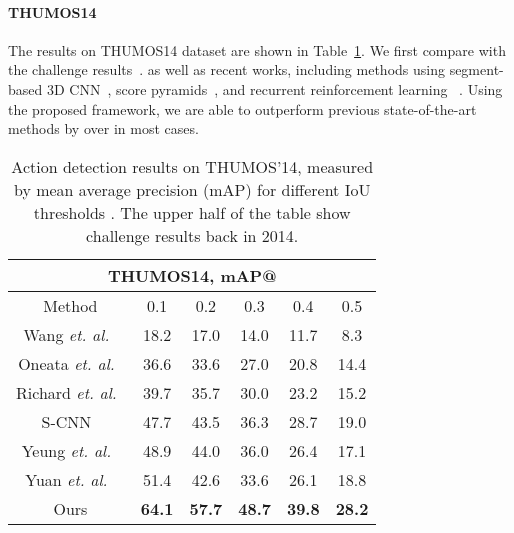 \documentclass[10pt,twocolumn,letterpaper]{article}
\begin{document}
\vspace{-10pt}
\paragraph{THUMOS14}
The results on THUMOS14 dataset are shown in Table~\ref{table: thumos14}.
We first compare with the challenge results~\cite{wang2014action,oneata2014lear,Richard2016Language}. 
as well as recent works, including methods using segment-based 3D CNN~\cite{Shou2016SCNN}, 
score pyramids~\cite{Yuan2016ScorePyramids}, and recurrent reinforcement learning ~\cite{Yeung2016FrameGlimpse}.
Using the proposed framework, we are able to outperform previous state-of-the-art methods by over  in most cases.

\begin{table}[t]
\begin{center}
\begin{tabular}{c|ccccc}
\hline
\multicolumn{6}{c}{\textbf{THUMOS14}, \textbf{mAP@}}                 \\ \hline
Method& 0.1  & 0.2  & 0.3  & 0.4  & 0.5  \\ \hline
Wang \emph{et. al.}~\cite{wang2014action} & 18.2 & 17.0 & 14.0 & 11.7 & 8.3 \\ \hline
Oneata \emph{et. al.}~\cite{oneata2014lear} & 36.6 & 33.6 & 27.0 &  20.8 & 14.4 \\ \hline
Richard \emph{et. al.}~\cite{Richard2016Language} & 39.7 & 35.7 & 30.0 & 23.2 & 15.2 \\ \hline\hline
S-CNN~\cite{Shou2016SCNN} & 47.7 & 43.5 & 36.3 & 28.7 & 19.0 \\ \hline
Yeung \emph{et. al.}~\cite{Yeung2016FrameGlimpse} & 48.9 & 44.0 & 36.0 & 26.4 & 17.1 \\ \hline
Yuan \emph{et. al.}~\cite{Yuan2016ScorePyramids} & 51.4 & 42.6& 33.6&26.1&18.8 \\\hline\hline
Ours & \textbf{64.1} & \textbf{57.7} & \textbf{48.7} & \textbf{39.8} & \textbf{28.2} \\
\hline
\end{tabular}
\end{center}
\caption{Action detection results on THUMOS’14, measured by mean average precision (mAP) for different IoU thresholds . The upper half of the table show challenge results back in 2014.}
\label{table: thumos14}
\end{table}


\vspace{-10pt}
\end{document}
